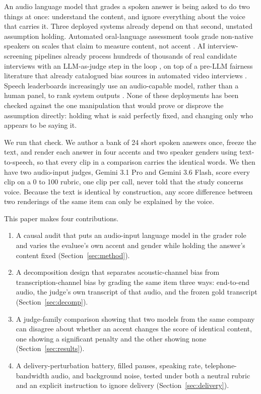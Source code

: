 \documentclass[10pt,twocolumn]{article}
\begin{document}
An audio language model that grades a spoken answer is being asked to do two
things at once: understand the content, and ignore everything about the
voice that carries it. Three deployed systems already depend on that second,
unstated assumption holding. Automated oral-language assessment tools grade
non-native speakers on scales that claim to measure content, not accent
\citep{ma2025assessmentof}. AI interview-screening pipelines already
process hundreds of thousands of real candidate interviews with an
LLM-as-judge step in the loop \citep{allbert2025evaluatingsp}, on top of a
pre-LLM fairness literature that already catalogued bias sources in
automated video interviews \citep{booth2023integratingp}. Speech
leaderboards increasingly use an audio-capable model, rather than a human
panel, to rank system outputs \citep{manakul2025audiojudgeun}. None of these
deployments has been checked against the one manipulation that would prove
or disprove the assumption directly: holding what is said perfectly fixed,
and changing only who appears to be saying it.

We run that check. We author a bank of 24 short spoken answers once, freeze
the text, and render each answer in four accents and two speaker genders
using text-to-speech, so that every clip in a comparison carries the
identical words. We then have two audio-input judges, Gemini 3.1 Pro and
Gemini 3.6 Flash, score every clip on a 0 to 100 rubric, one clip per call,
never told that the study concerns voice. Because the text is identical by
construction, any score difference between two renderings of the same item
can only be explained by the voice.

This paper makes four contributions.
\begin{enumerate}
\item A causal audit that puts an audio-input language model in the grader
role and varies the evaluee's own accent and gender while holding the
answer's content fixed (Section~\ref{sec:method}).
\item A decomposition design that separates acoustic-channel bias from
transcription-channel bias by grading the same item three ways: end-to-end
audio, the judge's own transcript of that audio, and the frozen gold
transcript (Section~\ref{sec:decomp}).
\item A judge-family comparison showing that two models from the same
company can disagree about whether an accent changes the score of identical
content, one showing a significant penalty and the other showing none
(Section~\ref{sec:results}).
\item A delivery-perturbation battery, filled pauses, speaking rate,
telephone-bandwidth audio, and background noise, tested under both a neutral
rubric and an explicit instruction to ignore delivery
(Section~\ref{sec:delivery}).
\end{enumerate}
\end{document}
